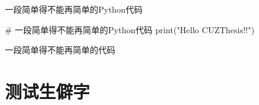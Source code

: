 \begin{appendices}
    \begin{listing}[H]
        \centering
        \caption{一段简单得不能再简单的Python代码}
        \label{code:samp-code-python}
        \begin{pythoncode}
            # 一段简单得不能再简单的Python代码
            print("Hello CUZThesis!!")
        \end{pythoncode}
    \end{listing}

    \begin{listing}[H]
        \centering
        \caption{一段简单得不能再简单的代码}
        \label{code:samp-code-latex}
    \end{listing}

    \section{测试生僻字} \label{sec:testcharacters}


\end{appendices}

